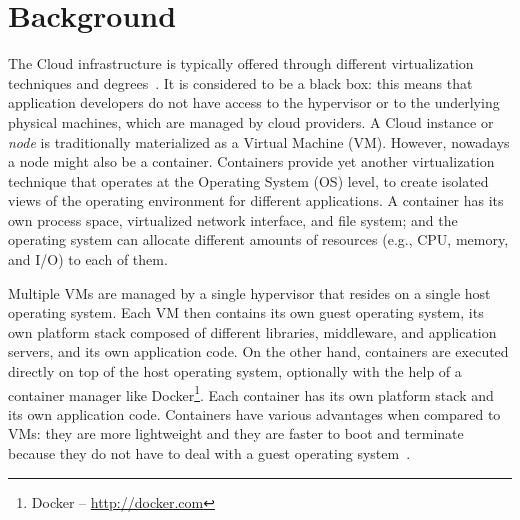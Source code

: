 \section{Background}\label{sec:background}


The Cloud infrastructure is typically offered through different virtualization techniques and degrees~\cite{leitner2016patterns, Quatrocchi2016discrete}. It is considered to be a black box: this means that application developers do not have access to the hypervisor or to the underlying physical machines, which are managed by cloud providers. A Cloud instance or \textit{node} is traditionally materialized as a Virtual Machine (VM). However, nowadays a node might also be a container. Containers provide yet another virtualization technique that operates at the Operating System (OS) level, to create isolated views of the operating environment for different applications. A container has its own process space, virtualized network interface, and file system; and the operating system can allocate different amounts of resources (e.g., CPU, memory, and I/O) to each of them.

Multiple VMs are managed by a single hypervisor that resides on a single host operating system. Each VM then contains its own guest operating system, its own platform stack composed of different libraries, middleware, and application servers, and its own application code. On the other hand, containers are executed directly on top of the host operating system, optionally with the help of a container manager like Docker\footnote{Docker -- \url{http://docker.com}}. Each container has its own platform stack and its own application code. Containers have various advantages when compared to VMs: they are more lightweight and they are faster to boot and terminate because they do not have to deal with a guest
operating system~\cite{FelterContainerVm15,SoletzContainerVirt14}.


